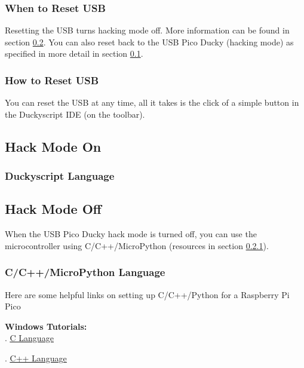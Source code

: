 \documentclass[a4paper,12pt]{article}
\begin{document}
\subsubsection{When to Reset USB}

Resetting the USB turns hacking mode off. More information can be found in section \ref{hack_mode_off}. You can also reset back to the USB Pico Ducky (hacking mode) as specified in more detail in section \ref{hack_mode_on}.

\subsubsection{How to Reset USB}\label{how_to_reset}

You can reset the USB at any time, all it takes is the click of a simple button in the Duckyscript IDE (on the toolbar). 

\subsection{Hack Mode On}\label{hack_mode_on}

\subsubsection{Duckyscript Language}

\subsection{Hack Mode Off}\label{hack_mode_off}

When the USB Pico Ducky hack mode is turned off, you can use the microcontroller using C/C++/MicroPython (resources in section \ref{cc_lang}).


\subsubsection{C/C++/MicroPython Language}\label{cc_lang}

Here are some helpful links on setting up C/C++/Python for a Raspberry Pi Pico

\textbf{Windows Tutorials:}\\
\indent{}. \underline{\href{https://www.raspberrypi.com/news/raspberry-pi-pico-windows-installer/}{C Language}}

\indent{}. \underline{\href{https://www.raspberrypi.com/news/raspberry-pi-pico-windows-installer/}{C++ Language}}
\end{document}
